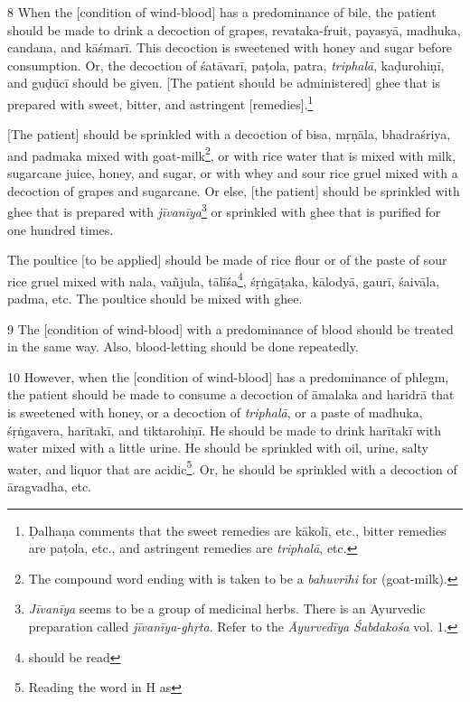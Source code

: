 \begin{translation}
    \item[8]
    When the [condition of wind-blood] has a predominance of bile, the patient should be made to drink a decoction of grapes, \gls{revataka}-fruit, \gls{payasyā}, \gls{madhuka}, \gls{candana}, and \gls{kāśmarī}. This decoction is sweetened with honey and sugar before consumption. Or, the decoction of \gls{śatāvarī}, \gls{paṭola}, \gls{patra}, \textit{triphalā}, \gls{kaḍurohiṇī}, and \gls{guḍūcī} should be given. [The patient should be administered] ghee that is prepared with sweet, bitter, and astringent [remedies].\footnote{Ḍalhaṇa comments \citep[425]{vulgate} that the sweet remedies are \gls{kākolī}, etc., bitter remedies are \gls{paṭola}, etc., and astringent remedies are \textit{triphalā}, etc.} 
    
    [The patient] should be sprinkled with a decoction of \gls{bisa}, \gls{mṛṇāla}, \gls{bhadraśriya}, and \gls{padmaka} mixed with goat-milk\footnote{The compound word ending with  is taken to be a \textit{bahuvrīhi} for  (goat-milk).}, or with rice water that is mixed with milk, sugarcane juice, honey, and sugar, or with whey and sour rice gruel mixed with a decoction of grapes and sugarcane. Or else, [the patient] should be sprinkled with ghee that is prepared with \textit{jīvanīya}\footnote{\textit{Jīvanīya} seems to be a group of medicinal herbs. There is an Ayurvedic preparation called \textit{jīvanīya-ghṛta}. Refer to the \textit{Āyurvedīya Śabdakośa} vol. 1.} or sprinkled with ghee that is purified for one hundred times.

    The poultice [to be applied] should be made of rice flour or of the paste of sour rice gruel mixed with \gls{nala}, \gls{vañjula}, \gls{tālīśa}\footnote{ should be read }, \gls{śṛṅgāṭaka}, \gls{kālodyā}, \gls{gaurī}, \gls{śaivāla}, \gls{padma}, etc. The poultice should be mixed with ghee.

    \item[9]
     The [condition of wind-blood] with a predominance of blood should be treated in the same way. Also, blood-letting should be done repeatedly.

     \item[10]
    However, when the [condition of wind-blood] has a predominance of phlegm, the patient should be made to consume a decoction of \gls{āmalaka} and \gls{haridrā} that is sweetened with honey, or a decoction of \textit{triphalā}, or a paste of \gls{madhuka}, \gls{śṛṅgavera}, \gls{harītakī}, and \gls{tiktarohiṇī}. He should be made to drink \gls{harītakī} with water mixed with a little urine. He should be sprinkled with oil, urine, salty water, and liquor that are acidic\footnote{Reading the word  in H as }. Or, he should be sprinkled with a decoction of \gls{āragvadha}, etc. 


\end{translation}
